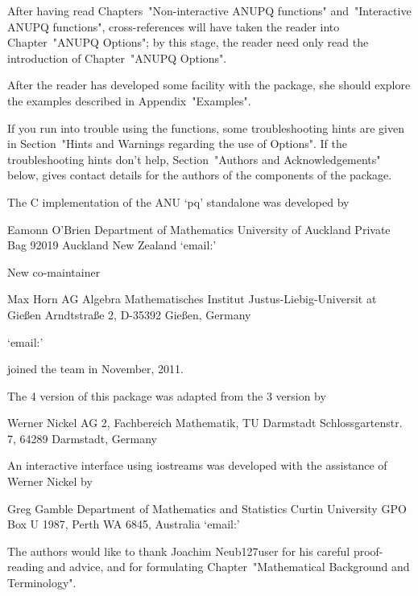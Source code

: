 After   having   read    Chapters~"Non-interactive    ANUPQ    functions"
and~"Interactive ANUPQ functions", cross-references will have  taken  the
reader into Chapter~"ANUPQ Options"; by this stage, the reader need  only
read the introduction of Chapter~"ANUPQ Options".

After the reader has developed some facility with the  {\ANUPQ}  package,
she should explore the examples described in Appendix~"Examples".

If  you  run  into   trouble   using   the   {\ANUPQ}   functions,   some
troubleshooting hints are given in Section~"Hints and Warnings  regarding
the  use  of  Options".  If  the  troubleshooting   hints   don't   help,
Section~"Authors and Acknowledgements" below, gives contact  details  for
the authors of the components of the {\ANUPQ} package.


The C implementation of the ANU `pq' standalone was developed by

\begintt
Eamonn O'Brien
Department of Mathematics
University of Auckland
Private Bag 92019
Auckland
New Zealand
\endtt
{}`email:' 

New co-maintainer

Max Horn
AG Algebra
Mathematisches Institut
Justus-Liebig-Universit{ a}t Gie{\ss}en
Arndtstra{\ss}e 2, D-35392 Gie{\ss}en, Germany

{}`email:' 

joined the team in November, 2011.

The {\GAP} 4 version of this package was adapted from the {\GAP} 3
version by  

\begintt
Werner Nickel
AG 2, Fachbereich Mathematik, TU Darmstadt
Schlossgartenstr. 7, 64289 Darmstadt, Germany
\endtt

An  interactive  interface  using  iostreams  was  developed   with   the
assistance of Werner Nickel by

\begintt
Greg Gamble
Department of Mathematics and Statistics
Curtin University
GPO Box U 1987, Perth WA 6845, Australia
\endtt
{}`email:' 

The authors would  like  to  thank  Joachim  Neub\accent127user  for  his
careful    proof-reading    and    advice,    and     for     formulating
Chapter~"Mathematical Background and Terminology".

